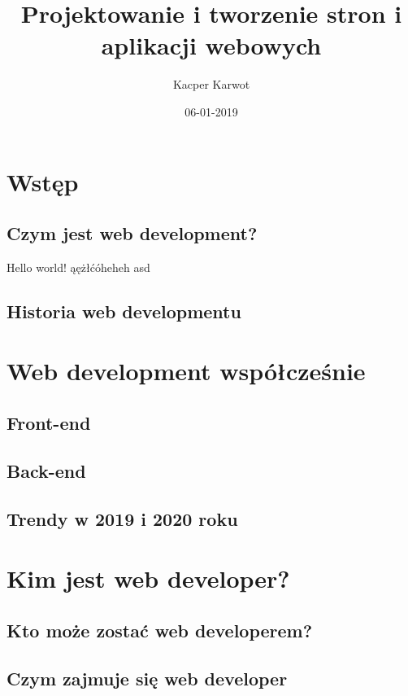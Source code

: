 \documentclass{report}
\title{Projektowanie i tworzenie stron i aplikacji webowych}
\date{06-01-2019}
\author{Kacper Karwot}
\begin{document}
	\maketitle
	\newpage
	\chapter{Wstęp}
	\section{Czym jest web development?}
	Hello world!
		ąężłćóheheh
		asd
 	\newpage
	\section{Historia web developmentu}
	
	\newpage 
	\chapter{Web development współcześnie}
	\section{Front-end}
	\newpage
	\section{Back-end}
	\newpage
	\section{Trendy w 2019 i 2020 roku}


	\newpage
	\chapter{Kim jest web developer?}
	\section{Kto może zostać web developerem?}
	\newpage
	\section{Czym zajmuje się web developer}

\tableofcontents
\end{document}
